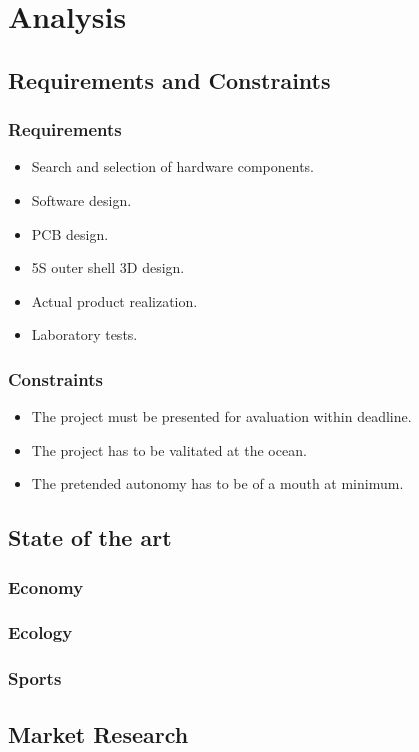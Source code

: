 \chapter{Analysis}
\section{Requirements and Constraints}
\subsection{Requirements}
\begin{itemize}
    \item Search and selection of hardware components.
    \item Software design.
    \item PCB design.
    \item 5S outer shell 3D design.
    \item Actual product realization.
    \item Laboratory tests.
\end{itemize}
\subsection{Constraints}
\begin{itemize}
    \item The project must be presented for avaluation within deadline.
    \item The project has to be valitated at the ocean.
    \item The pretended autonomy has to be of a mouth at minimum.
\end{itemize}
\section{State of the art}
\subsection{Economy}
\subsection{Ecology}
\subsection{Sports}
\section{Market Research}
